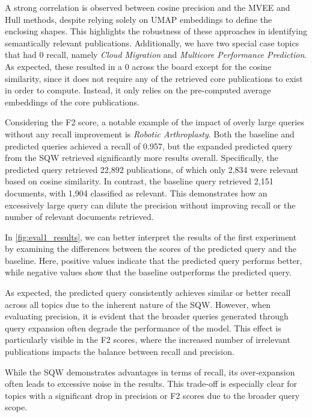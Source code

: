 A strong correlation is observed between cosine precision and the MVEE and Hull methods, despite relying solely on UMAP embeddings to define the enclosing shapes. This highlights the robustness of these approaches in identifying semantically relevant publications. Additionally, we have two special case topics that had 0 recall, namely \textit{Cloud Migration} and \textit{Multicore Performance Prediction}. As expected, these resulted in a 0 across the board except for the cosine similarity, since it does not require any of the retrieved core publications to exist in order to compute. Instead, it only relies on the pre-computed average embeddings of the core publications.

Considering the F2 score, a notable example of the impact of overly large queries without any recall improvement is \textit{Robotic Arthroplasty}. Both the baseline and predicted queries achieved a recall of 0.957, but the expanded predicted query from the SQW retrieved significantly more results overall. Specifically, the predicted query retrieved 22,892 publications, of which only 2,834 were relevant based on cosine similarity. In contrast, the baseline query retrieved 2,151 documents, with 1,904 classified as relevant. This demonstrates how an excessively large query can dilute the precision without improving recall or the number of relevant documents retrieved.

In \autoref{fig:eval1_results}, we can better interpret the results of the first experiment by examining the differences between the scores of the predicted query and the baseline. Here, positive values indicate that the predicted query performs better, while negative values show that the baseline outperforms the predicted query. 

As expected, the predicted query consistently achieves similar or better recall across all topics due to the inherent nature of the SQW. However, when evaluating precision, it is evident that the broader queries generated through query expansion often degrade the performance of the model. This effect is particularly visible in the F2 scores, where the increased number of irrelevant publications impacts the balance between recall and precision.

While the SQW demonstrates advantages in terms of recall, its over-expansion often leads to excessive noise in the results. This trade-off is especially clear for topics with a significant drop in precision or F2 scores due to the broader query scope.

